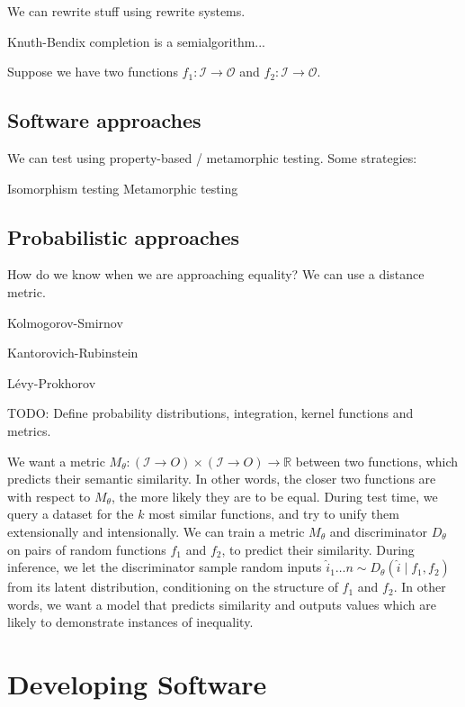 \documentclass[11pt]{article}
\begin{document}
    We can rewrite stuff using rewrite systems.

    Knuth-Bendix completion is a semialgorithm...

    Suppose we have two functions $f_1: \mathcal{I} \rightarrow \mathcal{O}$ and $f_2: \mathcal{I}\rightarrow \mathcal{O}$.


    \subsection{Software approaches}

    We can test using property-based / metamorphic testing. Some strategies:

    Isomorphism testing
    Metamorphic testing

    \subsection{Probabilistic approaches}

    How do we know when we are approaching equality? We can use a distance metric.

    Kolmogorov-Smirnov

    Kantorovich-Rubinstein

    L\'evy-Prokhorov

    TODO: Define probability distributions, integration, kernel functions and metrics.

    We want a metric $M_\theta: (\mathcal{I}\rightarrow{O}) \times (\mathcal{I}\rightarrow{O})\rightarrow \mathbb{R}$ between two functions, which predicts their semantic similarity. In other words, the closer two functions are with respect to $M_\theta$, the more likely they are to be equal. During test time, we query a dataset for the $k$ most similar functions, and try to unify them extensionally and intensionally. We can train a metric $M_\theta$ and discriminator $D_\theta$ on pairs of random functions $f_1$ and $f_2$, to predict their similarity. During inference, we let the discriminator sample random inputs $\hat i_1 \ldots n \sim D_\theta(\hat i \mid f_1, f_2)$ from its latent distribution, conditioning on the structure of $f_1$ and $f_2$. In other words, we want a model that predicts similarity and outputs values which are likely to demonstrate instances of inequality.

    \section{Developing Software}\label{sec:applications}
\end{document}
